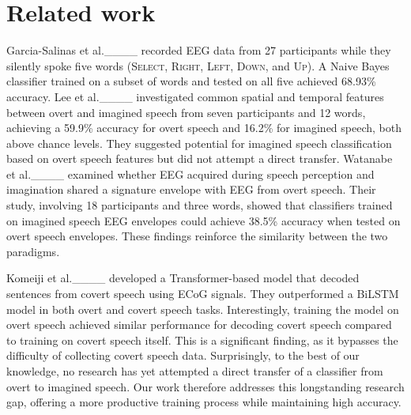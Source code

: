 \section{Related work}
\label{sec:relatedwork}

Garcia-Salinas et al.____ recorded EEG data from 27 participants
while they silently spoke five words (\textsc{Select}, \textsc{Right}, \textsc{Left}, \textsc{Down}, and \textsc{Up}). 
A Naive Bayes classifier trained on a subset of words and tested on all five achieved 68.93\% accuracy.
Lee et al.____ investigated common spatial and temporal features 
between overt and imagined speech from seven participants and 12 words, 
achieving a 59.9\% accuracy for overt speech and 16.2\% for imagined speech, both above chance levels. 
They suggested potential for imagined speech classification based on overt speech features 
but did not attempt a direct transfer. 
Watanabe et al.____ examined whether 
EEG acquired during speech perception and imagination shared a signature envelope with EEG from overt speech. 
Their study, involving 18 participants and three words, showed that classifiers trained on imagined speech EEG envelopes 
could achieve 38.5\% accuracy when tested on overt speech envelopes. 
These findings reinforce the similarity between the two paradigms.

Komeiji et al.____ developed a Transformer-based model 
that decoded sentences from covert speech using ECoG signals. 
They outperformed a BiLSTM model in both overt and covert speech tasks. 
Interestingly, training the model on overt speech achieved similar performance for decoding covert speech 
compared to training on covert speech itself. 
This is a significant finding, as it bypasses the difficulty of collecting covert speech data. 
Surprisingly, to the best of our knowledge, no research has yet attempted 
a direct transfer of a classifier from overt to imagined speech. 
Our work therefore addresses this longstanding research gap, 
offering a more productive training process while maintaining high accuracy.